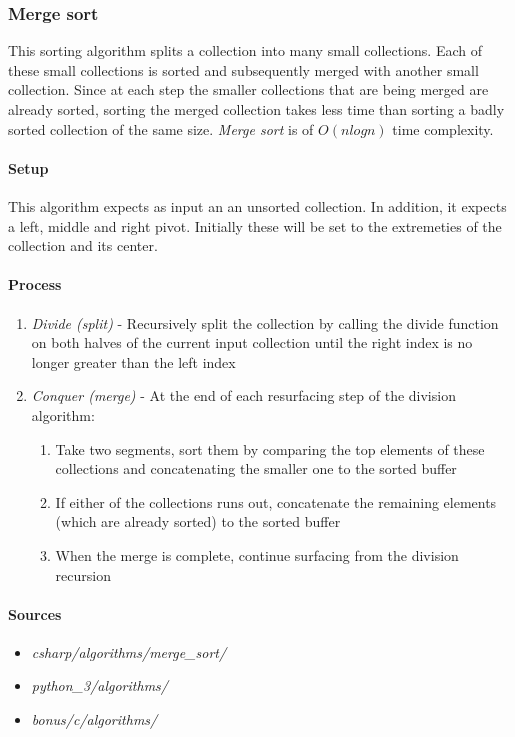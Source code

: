 \documentclass{article}
\begin{document}
\subsubsection{Merge sort}
This sorting algorithm splits a collection into many small collections. Each of these small collections is sorted and
subsequently merged with another small collection. Since at each step the smaller collections that are being merged
are already sorted, sorting the merged collection takes less time than sorting a badly sorted collection of the same
size. {\em Merge sort} is of \(O(n log n)\) time complexity.

\paragraph{Setup}
This algorithm expects as input an an unsorted collection. In addition, it expects a left, middle and right pivot.
Initially these will be set to the extremeties of the collection and its center.

\paragraph{Process}
\begin{enumerate}
\item{{\em Divide (split)} - Recursively split the collection by calling the divide function on both halves of the
current input collection until the right index is no longer greater than the left index}
\item{{\em Conquer (merge)} - At the end of each resurfacing step of the division algorithm:}
  \begin{enumerate}
  \item{Take two segments, sort them by comparing the top elements of these collections and concatenating the smaller
    one to the sorted buffer}
  \item{If either of the collections runs out, concatenate the remaining elements (which are already sorted) to the
    sorted buffer}
  \item{When the merge is complete, continue surfacing from the division recursion}
  \end{enumerate}
\end{enumerate}

\begin{samepage}
  \paragraph{Sources}
  \begin{itemize}
  \item{{\em csharp/algorithms/merge\_sort/}}
  \item{{\em python\_3/algorithms/}}
  \item{{\em bonus/c/algorithms/}}
  \end{itemize}
\end{samepage}
\end{document}
